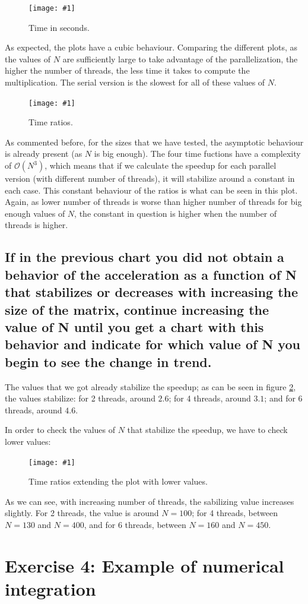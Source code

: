 \documentclass{article}
\newcommand{\myFigure}[4]{%
    \begin{figure}[!ht]
        \texttt{[image: \#1]}
        \centering
        \caption{#2}
        \label{#3}
    \end{figure}
}
\newcommand{\question}[1]{\subsection{#1}}
\begin{document}
\myFigure{../material/outputs/out3/test_cl0/t_fig.png}{Time in seconds.}{times_e3}{0.65}

As expected, the plots have a cubic behaviour. Comparing the different plots, as the values of $N$ are sufficiently large to take advantage of the parallelization, the higher the number of threads, the less time it takes to compute the multiplication. The serial version is the slowest for all of these values of $N$.

\myFigure{../material/outputs/out3/test_cl0/r_fig.png}{Time ratios.}{ratios}{0.65}

As commented before, for the sizes that we have tested, the asymptotic behaviour is already present (as $N$ is big enough). The four time fuctions have a complexity of $\mathcal{O}(N^3)$, which means that if we calculate the speedup for each parallel version (with different number of threads), it will stabilize around a constant in each case. This constant behaviour of the ratios is what can be seen in this plot. Again, as lower number of threads is worse than higher number of threads for big enough values of $N$, the constant in question is higher when the number of threads is higher.

\question{If in the previous chart you did not obtain a behavior of the acceleration as a function of N that stabilizes or decreases with increasing the size of the matrix, continue increasing the value of N until you get a chart with this behavior and indicate for which value of N you begin to see the change in trend.}

The values that we got already stabilize the speedup; as can be seen in figure \ref{ratios}, the values stabilize: for 2 threads, around $2.6$; for 4 threads, around $3.1$; and for 6 threads, around $4.6$.

In order to check the values of $N$ that stabilize the speedup, we have to check lower values:

\myFigure{../material/outputs/out3/test_cl0_extended/r_fig.png}{Time ratios extending the plot with lower values.}{ratios_extended}{0.63}

As we can see, with increasing number of threads, the sabilizing value increases slightly. For 2 threads, the value is around $N=100$; for 4 threads, between $N=130$ and $N=400$, and for 6 threads, between $N=160$ and $N=450$.


\pagebreak

\section{Exercise 4: Example of numerical integration}
\end{document}
